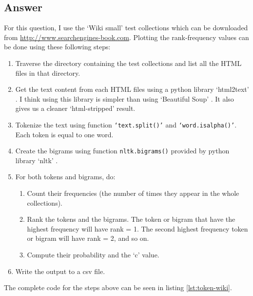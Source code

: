 \documentclass[letterpaper,11pt]{article}
\begin{document}
\subsection*{Answer}
For this question, I use the `Wiki small' test collections which can be downloaded from \url{http://www.searchengines-book.com}. Plotting the rank-frequency values can be done using these following steps:
\begin{enumerate}
\item Traverse the directory containing the test collections and list all the HTML files in that directory. 
\item Get the text content from each HTML files using a python library `html2text' \cite{html2text}. I think using this library is simpler than using `Beautiful Soup' \cite{bs4}. It also gives us a cleaner `html-stripped' result. 
\item Tokenize the text using function \texttt{`text.split()'} and  \texttt{`word.isalpha()'}. Each token is equal to one word. 
\item Create the bigrams using function \texttt{nltk.bigrams()} provided by python library `nltk' \cite{nltk}.
\item For both tokens and bigrams, do:
	\begin{enumerate}
	\item Count their frequencies (the number of times they appear in the whole collections). 
	\item Rank the tokens and the bigrams. The token or bigram that have the highest frequency will have rank = 1. The second highest frequency token or bigram will have rank = 2, and so on. 
	\item Compute their probability and the `c' value. 
	\end{enumerate}
\item Write the output to a csv file. 
\end{enumerate}

The complete code for the steps above can be seen in listing \ref{lst:token-wiki}. 
\end{document}
